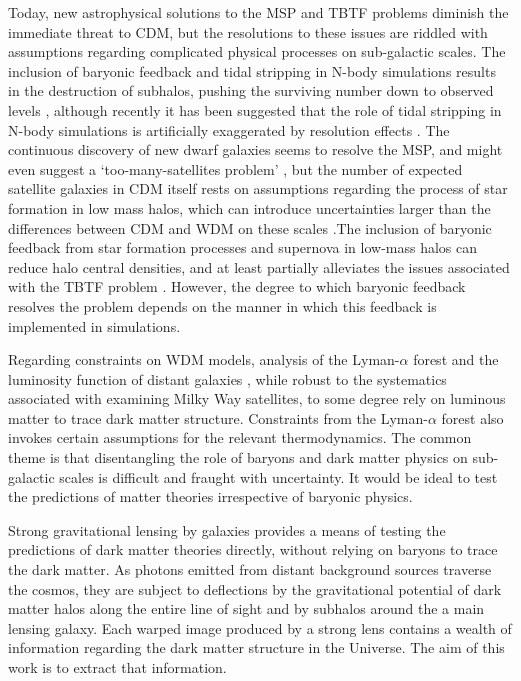 Today, new astrophysical solutions to the MSP and TBTF problems diminish the immediate threat to CDM, but the resolutions to these issues are riddled with assumptions regarding complicated physical processes on sub-galactic scales. The inclusion of baryonic feedback and tidal stripping in N-body simulations results in the destruction of subhalos, pushing the surviving number down to observed levels \citep{Kim++17}, although recently it has been suggested that the role of tidal stripping in N-body simulations is artificially exaggerated by resolution effects \citep{vandenBosch++18,ErraniPenarrubia19}. The continuous discovery of new dwarf galaxies seems to resolve the MSP, and might even suggest a `too-many-satellites problem' \citep{Kim++17b,Homma++19}, but the number of expected satellite galaxies in CDM itself rests on assumptions regarding the process of star formation in low mass halos, which can introduce uncertainties larger than the differences between CDM and WDM on these scales \citep{Nierenberg++16,Dooley++17,Newton++18}.The inclusion of baryonic feedback from star formation processes and supernova in low-mass halos can reduce halo central densities, and at least partially alleviates the issues associated with the TBTF problem \citep{Tollet++16}. However, the degree to which baryonic feedback resolves the problem depends on the manner in which this feedback is implemented in simulations. 

Regarding constraints on WDM models, analysis of the Lyman-$\alpha$ forest \citep{Viel13,Irsic++17} and the luminosity function of distant galaxies \citep{Menci++16,Castellano++19}, while robust to the systematics associated with examining Milky Way satellites, to some degree rely on luminous matter to trace dark matter structure. Constraints from the Lyman-$\alpha$ forest also invokes certain assumptions for the relevant thermodynamics. The common theme is that disentangling the role of baryons and dark matter physics on sub-galactic scales is difficult and fraught with uncertainty. It would be ideal to test the predictions of matter theories irrespective of baryonic physics. 

Strong gravitational lensing by galaxies provides a means of testing the predictions of dark matter theories directly, without relying on baryons to trace the dark matter. As photons emitted from distant background sources traverse the cosmos, they are subject to deflections by the gravitational potential of dark matter halos along the entire line of sight and by subhalos around the a main lensing galaxy. Each warped image produced by a strong lens contains a wealth of information regarding the dark matter structure in the Universe. The aim of this work is to extract that information. 

